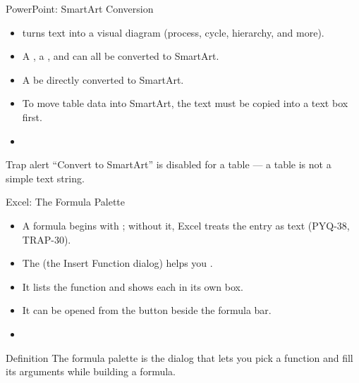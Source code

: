 \documentclass[aspectratio=169]{beamer}
\begin{document}
\begin{frame}{PowerPoint: SmartArt Conversion}
  \begin{itemize}
    \item {} turns text into a visual diagram (process, cycle,
      hierarchy, and more).
    \item A , a , and  can all be converted to SmartArt.
    \item A   be directly converted to
      SmartArt.
    \item To move table data into SmartArt, the text must be copied into a
      text box first.
    \item {}
  \end{itemize}
  \begin{alertblock}{Trap alert}
    ``Convert to SmartArt'' is disabled for a table --- a table is not a
    simple text string.
  \end{alertblock}
\end{frame}

\begin{frame}{Excel: The Formula Palette}
  \begin{itemize}
    \item A formula begins with \key{=}; without it, Excel treats the entry
      as text (PYQ-38, TRAP-30).
    \item The  (the Insert Function dialog) helps you
      .
    \item It lists the function and shows each  in its own
      box.
    \item It can be opened from the  button beside the formula bar.
    \item {}
  \end{itemize}
  \begin{block}{Definition}
    The formula palette is the dialog that lets you pick a function and fill
    its arguments while building a formula.
  \end{block}
\end{frame}
\end{document}
